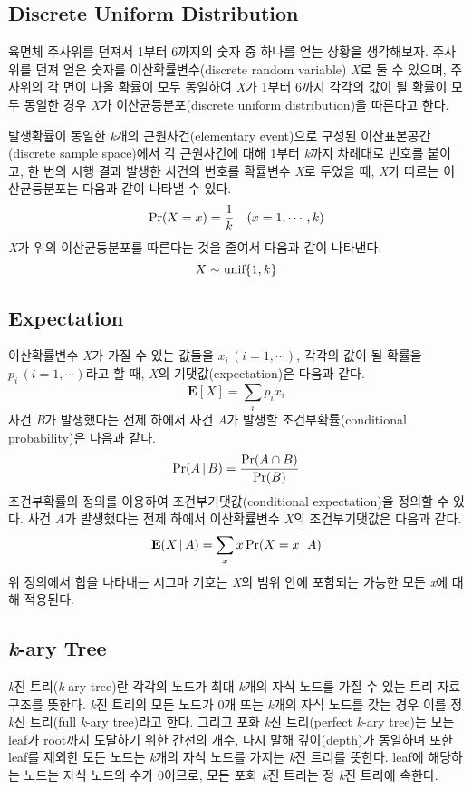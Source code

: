 \documentclass[11pt]{article}
\begin{document}
\subsection{Discrete Uniform Distribution}
육면체 주사위를 던져서 1부터 6까지의 숫자 중 하나를 얻는 상황을 생각해보자. 주사위를 던져 얻은 숫자를 이산확률변수(discrete random variable) \textit{X}로 둘 수 있으며, 주사위의 각 면이 나올 확률이 모두 동일하여 \textit{X}가 1부터 6까지 각각의 값이 될 확률이 모두 동일한 경우 \textit{X}가 이산균등분포(discrete uniform distribution)을 따른다고 한다.

발생확률이 동일한 \textit{k}개의 근원사건(elementary event)으로 구성된 이산표본공간(discrete sample space)에서 각 근원사건에 대해 1부터 \textit{k}까지 차례대로 번호를 붙이고, 한 번의 시행 결과 발생한 사건의 번호를 확률변수 \textit{X}로 두었을 때, \textit{X}가 따르는 이산균등분포는 다음과 같이 나타낼 수 있다.
\[\textnormal{Pr}(X = x) = \frac{1}{k} \quad(x = 1,\cdots, k)\]
\textit{X}가 위의 이산균등분포를 따른다는 것을 줄여서 다음과 같이 나타낸다.
\[X \sim \textnormal{unif}\{1, k\}\]

\subsection{Expectation}
이산확률변수 \textit{X}가 가질 수 있는 값들을 $x_i \, (i = 1, \cdots)$, 각각의 값이 될 확률을 $p_i \, (i = 1, \cdots)$라고 할 때, \textit{X}의 기댓값(expectation)은 다음과 같다.
\[\textbf{E}[X] = \sum_{i} p_{i} x_{i}\]
사건 \textit{B}가 발생했다는 전제 하에서 사건 \textit{A}가 발생할 조건부확률(conditional probability)은 다음과 같다.
\[\textnormal{Pr}(A\,|\,B) = \frac{\textnormal{Pr}(A \cap B)}{\textnormal{Pr}(B)}\]
조건부확률의 정의를 이용하여 조건부기댓값(conditional expectation)을 정의할 수 있다. 사건 \textit{A}가 발생했다는 전제 하에서 이산확률변수 \textit{X}의 조건부기댓값은 다음과 같다.
\[\textbf{E}(X\,|\,A) = \sum_{x} x\,\textnormal{Pr}(X = x\,|\,A)\]
위 정의에서 합을 나타내는 시그마 기호는 \textit{X}의 범위 안에 포함되는 가능한 모든 \textit{x}에 대해 적용된다.

\subsection{\textit{k}-ary Tree}
\textit{k}진 트리(\textit{k}-ary tree)란 각각의 노드가 최대 \textit{k}개의 자식 노드를 가질 수 있는 트리 자료구조를 뜻한다. \textit{k}진 트리의 모든 노드가 0개 또는 \textit{k}개의 자식 노드를 갖는 경우 이를 정 \textit{k}진 트리(full \textit{k}-ary tree)라고 한다. 그리고 포화 \textit{k}진 트리(perfect \textit{k}-ary tree)는 모든 leaf가 root까지 도달하기 위한 간선의 개수, 다시 말해 깊이(depth)가 동일하며 또한 leaf를 제외한 모든 노드는 \textit{k}개의 자식 노드를 가지는 \textit{k}진 트리를 뜻한다. leaf에 해당하는 노드는 자식 노드의 수가 0이므로, 모든 포화 \textit{k}진 트리는 정 \textit{k}진 트리에 속한다.
\end{document}
